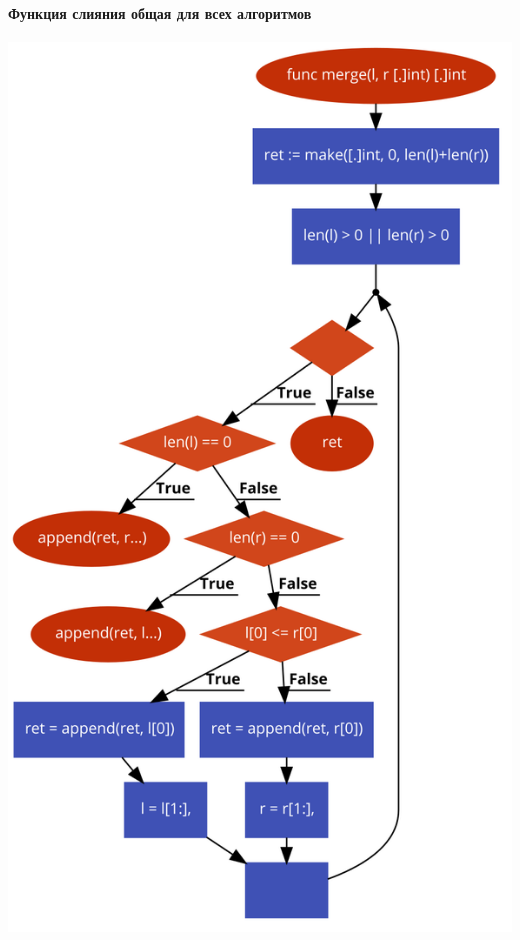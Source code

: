 \documentclass[utf8x, 12pt]{G7-32} %
\begin{document}
\paragraph{Функция слияния общая для всех алгоритмов}
\begin{center}
	\includegraphics[scale=0.32]{images/merge.png}
\end{center}

\newpage
\end{document}
